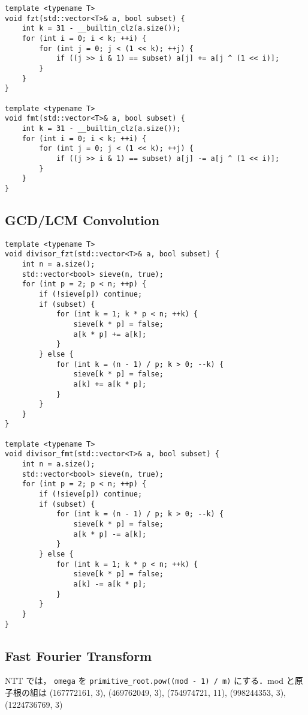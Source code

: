 \begin{lstlisting}
template <typename T>
void fzt(std::vector<T>& a, bool subset) {
    int k = 31 - __builtin_clz(a.size());
    for (int i = 0; i < k; ++i) {
        for (int j = 0; j < (1 << k); ++j) {
            if ((j >> i & 1) == subset) a[j] += a[j ^ (1 << i)];
        }
    }
}

template <typename T>
void fmt(std::vector<T>& a, bool subset) {
    int k = 31 - __builtin_clz(a.size());
    for (int i = 0; i < k; ++i) {
        for (int j = 0; j < (1 << k); ++j) {
            if ((j >> i & 1) == subset) a[j] -= a[j ^ (1 << i)];
        }
    }
}
\end{lstlisting}

\subsection{GCD/LCM Convolution}

\begin{lstlisting}
template <typename T>
void divisor_fzt(std::vector<T>& a, bool subset) {
    int n = a.size();
    std::vector<bool> sieve(n, true);
    for (int p = 2; p < n; ++p) {
        if (!sieve[p]) continue;
        if (subset) {
            for (int k = 1; k * p < n; ++k) {
                sieve[k * p] = false;
                a[k * p] += a[k];
            }
        } else {
            for (int k = (n - 1) / p; k > 0; --k) {
                sieve[k * p] = false;
                a[k] += a[k * p];
            }
        }
    }
}

template <typename T>
void divisor_fmt(std::vector<T>& a, bool subset) {
    int n = a.size();
    std::vector<bool> sieve(n, true);
    for (int p = 2; p < n; ++p) {
        if (!sieve[p]) continue;
        if (subset) {
            for (int k = (n - 1) / p; k > 0; --k) {
                sieve[k * p] = false;
                a[k * p] -= a[k];
            }
        } else {
            for (int k = 1; k * p < n; ++k) {
                sieve[k * p] = false;
                a[k] -= a[k * p];
            }
        }
    }
}
\end{lstlisting}

\subsection{Fast Fourier Transform}

\begin{small}
NTT では， \texttt{omega} を \texttt{primitive\_root.pow((mod - 1) / m)} にする．mod と原子根の組は
(167772161, 3), (469762049, 3), (754974721, 11), (998244353, 3), (1224736769, 3)

\end{small}

